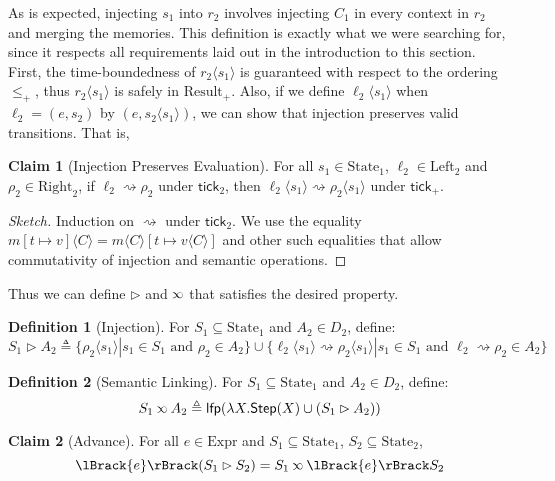 \documentclass{article}
\theoremstyle{definition}
\newtheorem{definition}{Definition}[section]
\newtheorem{clm}{Claim}[section]
\newcommand*{\Expr}{\text{Expr}}
\newcommand*{\Left}{\text{Left}}
\newcommand*{\Right}{\text{Right}}
\newcommand*{\mem}{m}
\newcommand*{\State}{\text{State}}
\newcommand*{\Result}{\text{Result}}
\newcommand*{\lfp}{\mathsf{lfp}}
\newcommand*{\Step}{\mathsf{Step}}
\newcommand*{\semarrow}{\rightsquigarrow}
\newcommand*{\semlink}{\mathbin{\rotatebox[origin=c]{180}{$\propto$}}}
\newcommand*{\sembracket}[1]{\lBrack{#1}\rBrack}
\newcommand*{\tick}{\mathsf{tick}}
\newcommand*{\inject}[2]{{#2}\langle{#1}\rangle}
\begin{document}
As is expected, injecting $s_1$ into $r_2$ involves injecting $C_1$ in every context in $r_2$ and merging the memories.
This definition is exactly what we were searching for, since it respects all requirements laid out in the introduction to this section.
First, the time-boundedness of $\inject{s_1}{r_2}$ is guaranteed with respect to the ordering $\le_+$, thus $\inject{s_1}{r_2}$ is safely in $\Result_+$.
Also, if we define $\inject{s_1}{\ell_2}$ when $\ell_2=(e,s_2)$ by $(e,\inject{s_1}{s_2})$, we can show that injection preserves valid transitions. That is,
\begin{clm}[Injection Preserves Evaluation]
  For all $s_1\in\State_1$, $\ell_2\in\Left_2$ and $\rho_2\in\Right_2$,
  if $\ell_2\semarrow\rho_2$ under $\tick_2$, then $\inject{s_1}{\ell_2}\semarrow\inject{s_1}{\rho_2}$ under $\tick_+$.
\end{clm}
\begin{proof}[Sketch]
  Induction on $\semarrow$ under $\tick_2$.
  We use the equality $\inject{C}{\mem[t\mapsto v]}=\inject{C}{\mem}[t\mapsto\inject{C}{v}]$ and other such equalities that allow commutativity of injection and semantic operations.
\end{proof}

Thus we can define $\rhd$ and $\semlink$ that satisfies the desired property.
\begin{definition}[Injection]
  For $S_1\subseteq\State_1$ and $A_2\in D_2$, define:
  \[
    S_1\rhd A_2\triangleq\{\inject{s_1}{\rho_2}|s_1\in S_1\text{ and }\rho_2\in A_2\}\cup\{\inject{s_1}{\ell_2}\semarrow\inject{s_1}{\rho_2}|s_1\in S_1\text{ and }\ell_2\semarrow\rho_2\in A_2\}
  \]
\end{definition}
\begin{definition}[Semantic Linking]
  For $S_1\subseteq\State_1$ and $A_2\in D_2$, define:
  \[
    S_1\semlink A_2\triangleq\lfp(\lambda X.\Step(X)\cup(S_1\rhd A_2))
  \]
\end{definition}
\begin{clm}[Advance]
  For all $e\in\Expr$ and $S_1\subseteq\State_1$, $S_2\subseteq\State_2$,
  \[
    \sembracket{e}(S_1\rhd S_2)=S_1\semlink\sembracket{e}S_2
  \]
\end{clm}
\end{document}
